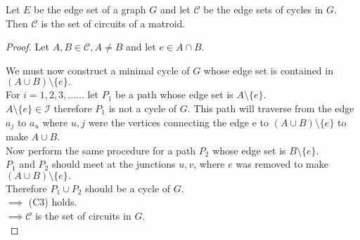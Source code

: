 \documentclass[../main.tex]{subfiles}
\begin{document}
 \begin{thm}
 Let $E$ be the edge set of a graph $G$ and let $\mathcal{C}$ be the edge sets of cycles in $G$.\\
 \noindent Then $\mathcal{C}$ is the set of circuits of a matroid.
 \end{thm}

\begin{proof}
Let $A, B \in \mathcal{C}, A \neq B $ and let $e \in A \cap B .$

\vspace{1mm}

\noindent We must now construct a minimal cycle of $G$ whose edge set is contained in $(A \cup B) \setminus \{e\}.$\\
\noindent For $ i = 1,2,3,...... $ let $P_1$ be a path whose edge set is $ A \setminus \{e\}.$\\
\noindent $ A \setminus \{e\} \in \mathcal{I} $ therefore $P_1$ is not a cycle of $G$. This path will traverse from the edge $a_j$ to $a_u$ where $u,j$ were the vertices connecting the edge e to $(A \cup B) \setminus \{e\}$ to make $A \cup B$.\\
\noindent Now perform the same procedure for a path $P_2$ whose edge set is $B \setminus \{e\}.$\\
\noindent $P_1$ and $P_2$ should meet at the junctions $u,v$,  where $e$ was removed to make $ (A \cup B) \setminus \{e\}.$\\
\noindent Therefore $P_1 \cup P_2$ should be a cycle of $G$.\\
\noindent $\implies$ (C3) holds.\\
\noindent $\implies \mathcal{C}$ is the set of circuits in $G$.\\
\end{proof}
\end{document}
